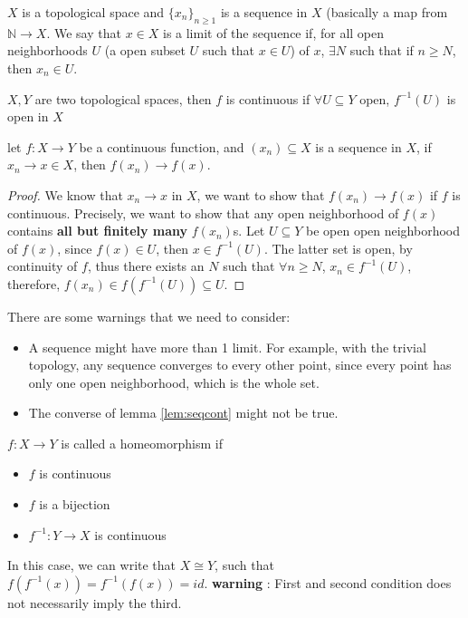 \documentclass[12pt]{article}
\begin{document}
\begin{definition}
    $X$ is a topological space and $\{x_n\}_{n \geq 1}$ is a sequence in $X$ (basically a map from $\mathbb{N} \to X$. We say that $x \in X$ is a limit of the sequence if, for all open neighborhoods $U$ (a open subset $U$ such that $x \in U$) of $x$, $\exists N$ such that if $n \geq N$, then $x_n \in U$.  
\end{definition}
\begin{definition}[continuous]
    $X,Y$ are two topological spaces, then $f$ is continuous if $\forall U \subseteq Y$ open, $f^{-1}(U)$ is open in $X$ 
\end{definition} 
\begin{lemma}\label{lem:seqcont}
	let $f \colon X \to Y$ be a continuous function, and $(x_n) \subseteq X$ is a sequence in $X$, if $x_n \to x \in X$, then $f(x_n) \to f(x)$. 	
\end{lemma}
\begin{proof}
	We know that $x_n \to x$ in $X$, we want to show that $f(x_n) \to f(x)$ if $f$ is continuous. Precisely, we want to show that any open neighborhood of $f(x)$ contains \textbf{all but finitely many} $f(x_n)$s. Let $U \subseteq Y$ be open open neighborhood of $f(x)$, since $f(x) \in U$, then $x \in f^{-1}(U)$. The latter set is open, by continuity of $f$, thus there exists an $N$ such that $\forall n \geq N$, $x_n \in f^{-1}(U)$, therefore, $f(x_n) \in f(f^{-1}(U)) \subseteq U$. 
	
\end{proof}
There are some warnings that we need to consider: 
\begin{itemize}
	\item A sequence might have more than 1 limit. For example,  with the trivial topology, any sequence converges to every other point, since every point has only one open neighborhood, which is the whole set. 
	\item The converse of lemma \ref{lem:seqcont} might not be true. 
\end{itemize}
\begin{definition}
	$f\colon X \to Y$ is called a homeomorphism if 
	\begin{itemize}
		\item $f$ is continuous
		\item $f$ is a bijection
		\item $f^{-1} \colon Y \to X$ is continuous
	\end{itemize}
	In this case, we can write that $X \cong Y$, such that $f(f^{-1}(x)) = f^{-1}(f(x)) = id$.
	\textbf{warning} : First and second condition does not necessarily imply the third.
\end{definition}
\end{document}
